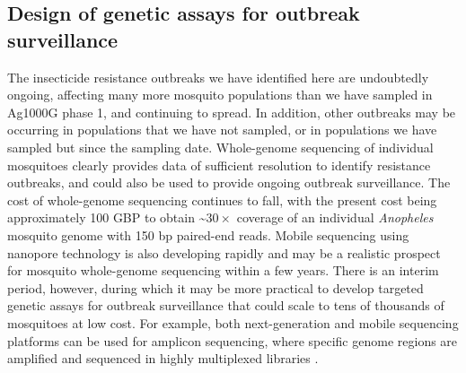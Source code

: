 \documentclass[a4paper,11pt,abstracton,hidelinks]{scrartcl}
\begin{document}
\subsection*{Design of genetic assays for outbreak surveillance}


%
The insecticide resistance outbreaks we have identified here are undoubtedly ongoing, affecting many more mosquito populations than we have sampled in Ag1000G phase 1, and continuing to spread.
%
In addition, other outbreaks may be occurring in populations that we have not sampled, or in populations we have sampled but since the sampling date.
%
Whole-genome sequencing of individual mosquitoes clearly provides data of sufficient resolution to identify resistance outbreaks, and could also be used to provide ongoing outbreak surveillance.
%
The cost of whole-genome sequencing continues to fall, with the present cost being approximately 100 GBP to obtain \textasciitilde$30\times$ coverage of an individual \emph{Anopheles} mosquito genome with 150 bp paired-end reads.
%
Mobile sequencing using nanopore technology is also developing rapidly \cite{Jain2016} and may be a realistic prospect for mosquito whole-genome sequencing within a few years.
%
There is an interim period, however, during which it may be more practical to develop targeted genetic assays for outbreak surveillance that could scale to tens of thousands of mosquitoes at low cost.
%
For example, both next-generation and mobile sequencing platforms can be used for amplicon sequencing, where specific genome regions are amplified and sequenced in highly multiplexed libraries \cite{Bybee2011, Murray2015}.
\end{document}
